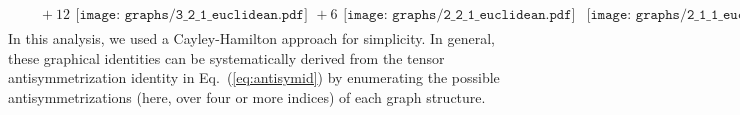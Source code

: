\documentclass[aps,prd,floatfix,preprintnumbers,twocolumn,groupedaddress,nofootinbib,longbibliography,10pt]{revtex4-1}
\DeclareRobustCommand{\Eq}[1]{Eq.~(\ref{#1})}
\begin{document}
\begin{align}
\nonumber\\ &\quad+ 12 \begin{gathered}\texttt{[image: graphs/3\_2\_1\_euclidean.pdf]}\end{gathered}
+ 6 \begin{gathered}\texttt{[image: graphs/2\_2\_1\_euclidean.pdf]}\end{gathered}\begin{gathered}\texttt{[image: graphs/2\_1\_1\_euclidean.pdf]}\end{gathered}
- 8\, \begin{gathered} \texttt{[image: graphs/2\_1\_1\_euclidean.pdf]}\end{gathered}.
\label{eq:sphid2}
\end{align}
In this analysis, we used a Cayley-Hamilton approach for simplicity.
%
In general, these graphical identities can be systematically derived from the tensor antisymmetrization identity in \Eq{eq:antisymid} by enumerating the possible antisymmetrizations (here, over four or more indices) of each graph structure.
\end{document}
